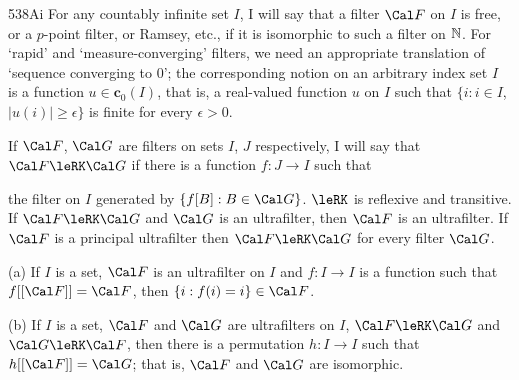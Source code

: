 \spheader 538Ai For any countably infinite set $I$, I will say that a
filter $\Cal F$ on $I$ is free, or a $p$-point filter, or Ramsey, etc., if
it is isomorphic to such a filter on $\Bbb N$.      For `rapid' and `measure-converging'
filters, we need an appropriate translation of
`sequence converging to $0$';  the corresponding notion on an arbitrary
index set $I$ is a function $u\in\pmb{c}_0(I)$, that is,
a real-valued function $u$ on $I$ such that
$\{i:i\in I$, $|u(i)|\ge\epsilon\}$ is finite for every
$\epsilon>0$.


 If
$\Cal F$, $\Cal G$ are filters on sets $I$, $J$ respectively, I will
say that
$\Cal F\leRK\Cal G$ if there is a function $f:J\to I$ such that


\noindent the filter on $I$ generated by
$\{f[B]:B\in\Cal G\}$.
$\leRK$ is reflexive and transitive.   If $\Cal F\leRK\Cal G$ and
$\Cal G$ is an ultrafilter, then $\Cal F$ is an
ultrafilter.   If
$\Cal F$ is a principal ultrafilter then $\Cal F\leRK\Cal G$ for every
filter $\Cal G$.

 (a) If $I$ is a set, $\Cal F$ is an ultrafilter on
$I$ and $f:I\to I$ is a function such that $f[[\Cal F]]=\Cal F$, then
$\{i:f(i)=i\}\in\Cal F$.

(b) If $I$ is a set, $\Cal F$ and $\Cal G$ are ultrafilters on $I$,
$\Cal F\leRK\Cal G$ and $\Cal G\leRK\Cal F$, then there is a permutation
$h:I\to I$ such that $h[[\Cal F]]=\Cal G$;  that is, $\Cal F$ and
$\Cal G$ are isomorphic.

